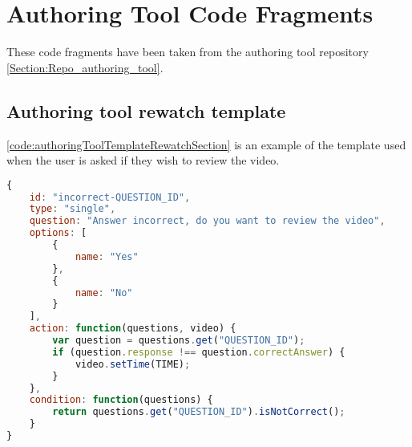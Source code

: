 \section{Authoring Tool Code Fragments}

These code fragments have been taken from the authoring tool repository \autoref{Section:Repo_authoring_tool}.

\subsection{Authoring tool rewatch template}

\autoref{code:authoringToolTemplateRewatchSection} is an example of the template used when the user is asked if they wish to review the video.

\begin{lstlisting}[language=javascript,caption={Base template for a question asking if the viewer wishs to review the video section they answered incorrectly},label={code:authoringToolTemplateRewatchSection} ]
{
	id: "incorrect-QUESTION_ID",
	type: "single",
	question: "Answer incorrect, do you want to review the video",
	options: [
		{
			name: "Yes"
		},
		{
			name: "No"
		}
	],
	action: function(questions, video) {
		var question = questions.get("QUESTION_ID");
		if (question.response !== question.correctAnswer) {
			video.setTime(TIME);
		}
	},
	condition: function(questions) {
		return questions.get("QUESTION_ID").isNotCorrect();
	}
}
\end{lstlisting}